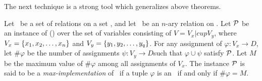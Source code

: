
The next technique is a strong tool which generalizes above theorems. 

\begin{defi}\label{def:max}
Let \mrelset\ be a set of relations on a set \mD, and let \mR\ be an \(n\)-ary relation on \mD\@. 
Let \(\mathcal{P}\) be an instance of \ccsp(\mrelset) over the set of variables consisting of 
\(V = V_x |cup V_y\), where \(V_x = \{{x_1,x_2,\dotsc,x_n}\}\) and 
\(V_y=\{{y_1,y_2,\dotsc,y_q}\}\)\@. For any assignment of \(\varphi: V_x \to D\),
let \(\#\varphi\) be the number of assignments \(\psi : V_y \to D\)\@ such that 
\(\varphi \cup \psi\) satisfy \(\mathcal{P}\)\@. Let \(M\) be the maximum value of 
\(\#\varphi\) among all assignments of \(V_x\)\@. The instance \(\mathcal{P}\) is said to be
a \emph{max-implementation} of \mR\ if a tuple \(\varphi\) is an \mR\ if and only if
\(\#\varphi = M\)\@.
\end{defi}

